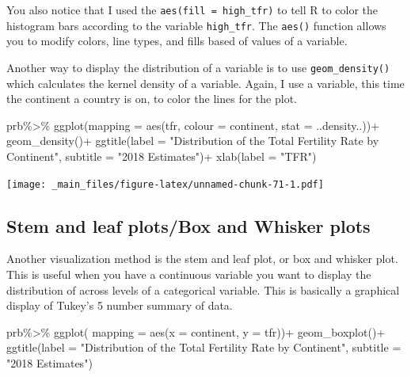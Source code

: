\documentclass[
]{book}
\newenvironment{Shaded}{\begin{snugshade}}{\end{snugshade}}
\newcommand{\AttributeTok}[1]{\textcolor[rgb]{0.77,0.63,0.00}{#1}}
\newcommand{\FunctionTok}[1]{\textcolor[rgb]{0.00,0.00,0.00}{#1}}
\newcommand{\NormalTok}[1]{#1}
\newcommand{\SpecialCharTok}[1]{\textcolor[rgb]{0.00,0.00,0.00}{#1}}
\newcommand{\StringTok}[1]{\textcolor[rgb]{0.31,0.60,0.02}{#1}}
\begin{document}
You also notice that I used the \texttt{aes(fill\ =\ high\_tfr)} to tell R to
color the histogram bars according to the variable \texttt{high\_tfr}. The
\texttt{aes()} function allows you to modify colors, line types, and fills
based of values of a variable.

Another way to display the distribution of a variable is to use
\texttt{geom\_density()} which calculates the kernel density of a variable.
Again, I use a variable, this time the continent a country is on, to
color the lines for the plot.

\begin{Shaded}
\begin{Highlighting}[]
\NormalTok{prb}\SpecialCharTok{\%\textgreater{}\%}
\FunctionTok{ggplot}\NormalTok{(}\AttributeTok{mapping =} \FunctionTok{aes}\NormalTok{(tfr,}
                     \AttributeTok{colour =}\NormalTok{ continent,}
                     \AttributeTok{stat =}\NormalTok{ ..density..))}\SpecialCharTok{+}
  \FunctionTok{geom\_density}\NormalTok{()}\SpecialCharTok{+}
  \FunctionTok{ggtitle}\NormalTok{(}\AttributeTok{label =} \StringTok{"Distribution of the Total Fertility Rate by Continent"}\NormalTok{,}
          \AttributeTok{subtitle =} \StringTok{"2018 Estimates"}\NormalTok{)}\SpecialCharTok{+}
  \FunctionTok{xlab}\NormalTok{(}\AttributeTok{label =} \StringTok{"TFR"}\NormalTok{)}
\end{Highlighting}
\end{Shaded}

\texttt{[image: \_main\_files/figure-latex/unnamed-chunk-71-1.pdf]}

\hypertarget{stem-and-leaf-plotsbox-and-whisker-plots}{%
\subsection{Stem and leaf plots/Box and Whisker plots}\label{stem-and-leaf-plotsbox-and-whisker-plots}}

Another visualization method is the stem and leaf plot, or box and
whisker plot. This is useful when you have a continuous variable you
want to display the distribution of across levels of a categorical
variable. This is basically a graphical display of Tukey's 5 number
summary of data.

\begin{Shaded}
\begin{Highlighting}[]
\NormalTok{prb}\SpecialCharTok{\%\textgreater{}\%}
  \FunctionTok{ggplot}\NormalTok{( }\AttributeTok{mapping =} \FunctionTok{aes}\NormalTok{(}\AttributeTok{x =}\NormalTok{ continent, }\AttributeTok{y =}\NormalTok{ tfr))}\SpecialCharTok{+}
  \FunctionTok{geom\_boxplot}\NormalTok{()}\SpecialCharTok{+}
  \FunctionTok{ggtitle}\NormalTok{(}\AttributeTok{label =} \StringTok{"Distribution of the Total Fertility Rate by Continent"}\NormalTok{,}
          \AttributeTok{subtitle =} \StringTok{"2018 Estimates"}\NormalTok{)}
\end{Highlighting}
\end{Shaded}
\end{document}
